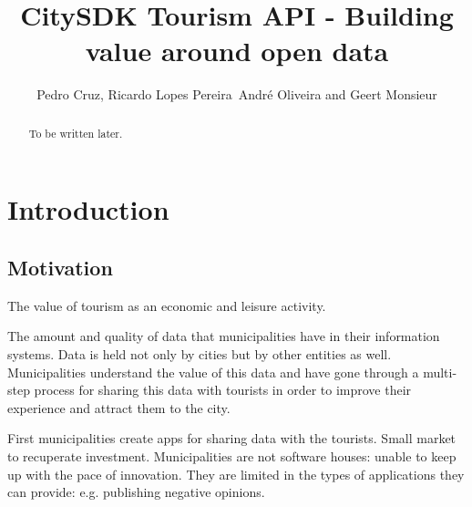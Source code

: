 \documentclass[times]{ettauth}
\begin{document}




\title{CitySDK Tourism API - Building value around open data}
\author{Pedro Cruz,
Ricardo Lopes Pereira\corrauth\,
Andr\'e Oliveira and 
Geert Monsieur}
\address{
 Instituto Superior T\'ecnico, Avenida Rovisco Pais 1, 1049-001 Lisboa, Portugal\\
 INESC-ID, Av. Prof. Dr. Cavaco Silva, 2744-016 Porto Salvo, Portugal\\
 ISA\\
 European Research Institute in Serivce Science (ERISS), Tilburg University, Warandelaan 2, 5037AB Tilburg, The Netherlands
}

\begin{abstract}
To be written later.
\end{abstract}

\maketitle

\acresetall
\section{Introduction}

\subsection{Motivation}
The value of tourism as an economic and leisure activity.

The amount and quality of data that municipalities have in their information systems. 
Data is held not only by cities but by other entities as well.
Municipalities understand the value of this data and have gone through a multi-step process for sharing this data with tourists in order to improve their experience and attract them to the city.

First municipalities create apps for sharing data with the tourists.
Small market to recuperate investment.
Municipalities are not software houses: unable to keep up with the pace of innovation. 
They are limited in the types of applications they can provide: e.g. publishing negative opinions.
\end{document}
